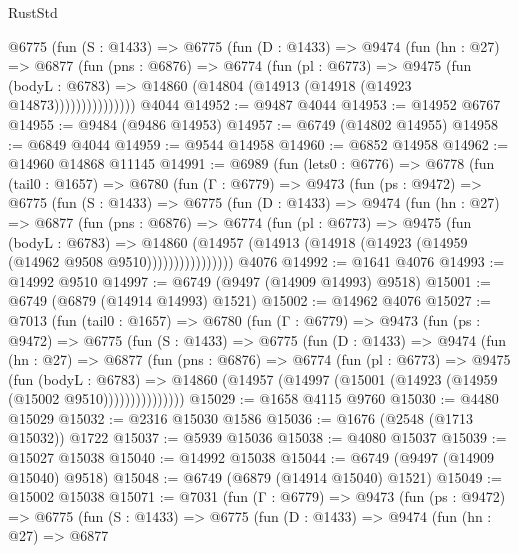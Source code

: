 \begin{lexlean}{RustStd}
\begin{coremodule}
            @6775
              (fun (S : @1433) =>
              @6775
                (fun (D : @1433) =>
                @9474
                  (fun (hn : @27) =>
                  @6877
                    (fun (pns : @6876) =>
                    @6774
                      (fun (pl : @6773) =>
                      @9475
                        (fun (bodyL : @6783) =>
                        @14860 (@14804 (@14913 (@14918 (@14923 @14873)))))))))))))))
    @4044
@14952 := @9487 @4044
@14953 := @14952 @6767
@14955 := @9484 (@9486 @14953)
@14957 := @6749 (@14802 @14955)
@14958 := @6849 @4044
@14959 := @9544 @14958
@14960 := @6852 @14958
@14962 := @14960 @14868 @11145
@14991 := @6989
    (fun (lets0 : @6776) =>
    @6778
      (fun (tail0 : @1657) =>
      @6780
        (fun (Γ : @6779) =>
        @9473
          (fun (ps : @9472) =>
          @6775
            (fun (S : @1433) =>
            @6775
              (fun (D : @1433) =>
              @9474
                (fun (hn : @27) =>
                @6877
                  (fun (pns : @6876) =>
                  @6774
                    (fun (pl : @6773) =>
                    @9475
                      (fun (bodyL : @6783) =>
                      @14860
                        (@14957 (@14913 (@14918 (@14923 (@14959 (@14962 @9508 @9510))))))))))))))))
    @4076
@14992 := @1641 @4076
@14993 := @14992 @9510
@14997 := @6749 (@9497 (@14909 @14993) @9518)
@15001 := @6749 (@6879 (@14914 @14993) @1521)
@15002 := @14962 @4076
@15027 := @7013
    (fun (tail0 : @1657) =>
    @6780
      (fun (Γ : @6779) =>
      @9473
        (fun (ps : @9472) =>
        @6775
          (fun (S : @1433) =>
          @6775
            (fun (D : @1433) =>
            @9474
              (fun (hn : @27) =>
              @6877
                (fun (pns : @6876) =>
                @6774
                  (fun (pl : @6773) =>
                  @9475
                    (fun (bodyL : @6783) =>
                    @14860 (@14957 (@14997 (@15001 (@14923 (@14959 (@15002 @9510)))))))))))))))
@15029 := @1658 @4115 @9760
@15030 := @4480 @15029
@15032 := @2316 @15030 @1586
@15036 := @1676 (@2548 (@1713 @15032)) @1722
@15037 := @5939 @15036
@15038 := @4080 @15037
@15039 := @15027 @15038
@15040 := @14992 @15038
@15044 := @6749 (@9497 (@14909 @15040) @9518)
@15048 := @6749 (@6879 (@14914 @15040) @1521)
@15049 := @15002 @15038
@15071 := @7031
    (fun (Γ : @6779) =>
    @9473
      (fun (ps : @9472) =>
      @6775
        (fun (S : @1433) =>
        @6775
          (fun (D : @1433) =>
          @9474
            (fun (hn : @27) =>
            @6877

\end{coremodule}
\end{lexlean}

